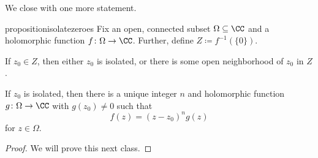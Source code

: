 We close with one more statement.
\begin{restatable}{proposition}{isolatezeroes} \label{prop:isolatezeroes}
	Fix an open, connected subset $\Omega\subseteq\CC$ and a holomorphic function $f\colon \Omega\to\CC$. Further, define $Z\coloneqq f^{-1}(\{0\})$.
	\begin{listalph}
		\item If $z_0\in Z$, then either $z_0$ is isolated, or there is some open neighborhood of $z_0$ in $Z$.
		\item If $z_0$ is isolated, then there is a unique integer $n$ and holomorphic function $g\colon \Omega\to\CC$ with $g(z_0)\ne0$ such that
		\[f(z)=(z-z_0)^ng(z)\]
		for $z\in\Omega$.
	\end{listalph}
\end{restatable}
\begin{proof}
	We will prove this next class.
\end{proof}